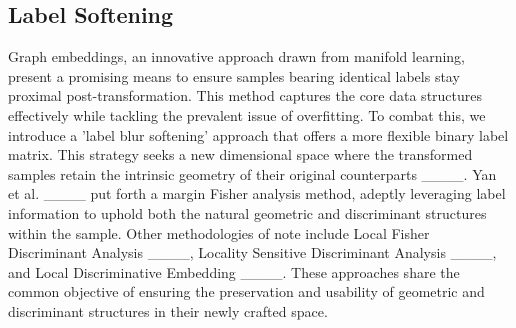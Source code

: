 \iffalse
For multi-omics fusion, MKL provides a natural framework. The high-dimensional space created by multiple kernel functions is a combined space that combines multiple feature spaces. This combined space can combine each subspace's different feature mapping capabilities and combine different heterogeneous data from multiple sources. The most suitable single-kernel function maps the features individually, and the data can be more accurately and reasonably expressed in the new combined space. For example, in ____, Zhang et al. extended SVM to the MKL version for Alzheimer’s disease (AD) recognition based on multi-modality data in which kernels are constructed in MRI, PET, and CSF modalities, respectively. Ahmed et al. employed “simpleMKL” ____ as the classifier to classify AD, MCI, and HCs based on local DTI and MRI modalities. However, for the original complex NPC data samples, the feature mapping process in high-dimensional space cannot benefit downstream classification tasks. Typically, when multi-Kernel learning is used for classification tasks, it aims to learn a transformation matrix that can transform the combination of Kernels into a binary label matrix. Due to the label fitting being very strict and having little freedom, the general classifier can not perform well when using the high-dimension features. 
\fi

\subsection{Label Softening}
Graph embeddings, an innovative approach drawn from manifold learning, present a promising means to ensure samples bearing identical labels stay proximal post-transformation. This method captures the core data structures effectively while tackling the prevalent issue of overfitting. To combat this, we introduce a 'label blur softening' approach that offers a more flexible binary label matrix. This strategy seeks a new dimensional space where the transformed samples retain the intrinsic geometry of their original counterparts ____. Yan et al. ____ put forth a margin Fisher analysis method, adeptly leveraging label information to uphold both the natural geometric and discriminant structures within the sample. Other methodologies of note include Local Fisher Discriminant Analysis ____, Locality Sensitive Discriminant Analysis ____, and Local Discriminative Embedding ____. These approaches share the common objective of ensuring the preservation and usability of geometric and discriminant structures in their newly crafted space.

